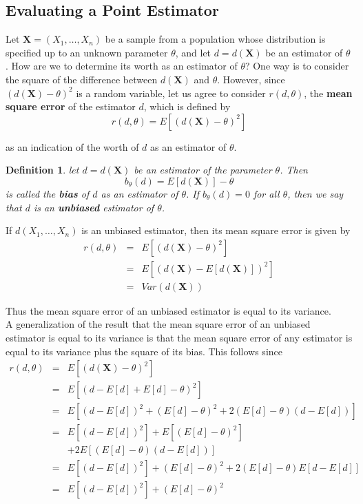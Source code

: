 \documentclass[12pt]{article}
\newtheorem{definition}[theorem]{Definition}
\begin{document}
\subsection{Evaluating a Point Estimator}

Let $\textbf{X} = (X_1, \dots, X_n)$ be a sample from a population whose distribution is specified up to an unknown parameter $\theta$, and let $d = d(\textbf{X})$ be an estimator of $\theta$. How are we to determine its worth as an estimator of $\theta$? One way is to consider the square of the difference between $d(\textbf{X})$ and $\theta$. However, since $(d(\textbf{X}) - \theta)^2$ is a random variable, let us agree to consider $r(d, \theta)$, the \textbf{mean square error} of the estimator $d$, which is defined by
\begin{equation*}
  r(d, \theta) = E[(d(\textbf{X}) - \theta)^2]
\end{equation*}

as an indication of the worth of $d$ as an estimator of $\theta$.

\begin{definition}
  let $d = d(\textbf{X})$ be an estimator of the parameter $\theta$. Then
  \begin{equation*}
    b_{\theta}(d) = E[d(\textbf{X})] - \theta
  \end{equation*}
  is called the \textbf{bias} of $d$ as an estimator of $\theta$. If $b_{\theta}(d) = 0$ for all $\theta$, then we say that $d$ is an \textbf{unbiased} estimator of $\theta$.
\end{definition}

If $d(X_1, \dots, X_n)$ is an unbiased estimator, then its mean square error is given by
\begin{eqnarray*}
  r(d, \theta)
  &=& E[(d(\textbf{X}) - \theta)^2] \\
  &=& E[(d(\textbf{X}) - E[d(\textbf{X})])^2] \\
  &=& Var(d(\textbf{X}))
\end{eqnarray*}

Thus the mean square error of an unbiased estimator is equal to its variance. \\

A generalization of the result that the mean square error of an unbiased estimator is equal to its variance is that the mean square error of any estimator is equal to its variance plus the square of its bias. This follows since
\begin{eqnarray*}
  r(d, \theta)
  &=& E[(d(\textbf{X}) - \theta)^2] \\
  &=& E[(d - E[d] + E[d] - \theta)^2] \\
  &=& E[ (d - E[d])^2 + (E[d] - \theta)^2 + 2(E[d] - \theta)(d - E[d]) ] \\
  &=& E[(d - E[d])^2] + E[(E[d] - \theta)^2] \\
  &&  + 2E[(E[d] - \theta)(d - E[d])] \\
  &=& E[(d - E[d])^2] + (E[d] - \theta)^2 
  + 2(E[d] - \theta)E[d - E[d]] \\
  &=& E[(d - E[d])^2] + (E[d] - \theta)^2
\end{eqnarray*}
\end{document}
